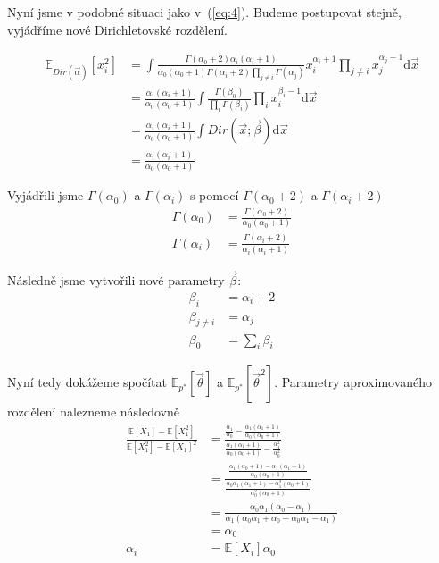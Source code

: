 Nyní jsme v podobné situaci jako v~(\ref{eq:4}). Budeme postupovat stejně,
vyjádříme nové Dirichletovské rozdělení.

\begin{align}
\mathbb{E}_{Dir(\vec\alpha)}[x_i^2] &=
\int \frac{\Gamma(\alpha_0 + 2) \alpha_i (\alpha_i + 1)}
		{\alpha_0 (\alpha_0 + 1) \Gamma(\alpha_i + 2) \prod_{j \ne i} \Gamma(\alpha_j)}
    x_i^{\alpha_i + 1} \prod_{j \ne i} x_j^{\alpha_j - 1}
\mathrm{d}\vec x
\\
&= \frac{\alpha_i (\alpha_i + 1)}
		{\alpha_0 (\alpha_0 + 1)}
	\int \frac{\Gamma(\beta_0)}
		{\prod_i \Gamma(\beta_i)}
        \prod_i x_i^{\beta_i - 1} 
    \mathrm{d}\vec x
\\
&= \frac{\alpha_i (\alpha_i + 1)}
		{\alpha_0 (\alpha_0 + 1)}
	\int Dir(\vec x; \vec\beta)
    \mathrm{d}\vec x
\\
&= \frac{\alpha_i (\alpha_i + 1)}
		{\alpha_0 (\alpha_0 + 1)}
\end{align}

Vyjádřili jsme $\Gamma(\alpha_0)$ a $\Gamma(\alpha_i)$ s pomocí $\Gamma(\alpha_0 + 2)$ a $\Gamma(\alpha_i + 2)$
\begin{align}
\Gamma(\alpha_0) &= \frac{\Gamma(\alpha_0 + 2)}
				{\alpha_0(\alpha_0 + 1)}
\\
\Gamma(\alpha_i) &= \frac{\Gamma(\alpha_i + 2)}
				{\alpha_i(\alpha_i + 1)}
\end{align}

Následně jsme vytvořili nové parametry $\vec\beta$:
\begin{align}
\beta_i &= \alpha_i + 2 \\
\beta_{j \ne i} &= \alpha_j \\
\beta_0 &= \sum_i \beta_i
\end{align}

Nyní tedy dokážeme spočítat $\mathbb{E}_{p^*}[\vec\theta]$ a $\mathbb{E}_{p^*}[\vec\theta^2]$.
Parametry aproximovaného rozdělení nalezneme následovně
\begin{align}
\frac{\mathbb{E}[X_1] - \mathbb{E}[X_1^2]}
     {\mathbb{E}[X_1^2] - \mathbb{E}[X_1]^2} &=
\frac{
	\frac{\alpha_1}
		{\alpha_0}
	- \frac{\alpha_1(\alpha_1 + 1)}
		{\alpha_0(\alpha_0 + 1)}
	}
	{
	\frac{\alpha_1(\alpha_1 + 1)}
		{\alpha_0(\alpha_0 + 1)}
	- \frac{\alpha_1^2}
		{\alpha_0^2}
	}
\label{eq:5}
\\
&=
\frac{
    \frac{\alpha_1 (\alpha_0 + 1) - \alpha_1(\alpha_1 + 1)}
         {\alpha_0 (\alpha_0 + 1)}
}{
    \frac{\alpha_0 \alpha_1 (\alpha_1 + 1) - \alpha_1^2 (\alpha_0 + 1)}
         {\alpha_0^2 (\alpha_0 + 1)}
}
\\
&=
\frac{\alpha_0 \alpha_1 (\alpha_0 - \alpha_1)}
     {\alpha_1 (\alpha_0 \alpha_1 + \alpha_0 - \alpha_0 \alpha_1 - \alpha_1)}
\\
&=
\alpha_0
\\
\alpha_i &= \mathbb{E}[X_i] \alpha_0 \label{eq:6}
\end{align}


